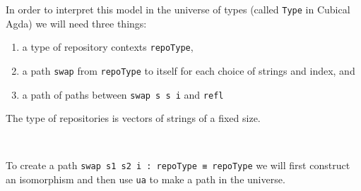In order to interpret this model in the universe of types (called \texttt{Type} in Cubical Agda)
we will need three things:
\begin{enumerate}
  \item a type of repository contexts \texttt{repoType},
  \item a path \texttt{swap} from \texttt{repoType} to itself for
        each choice of strings and index, and
  \item a path of paths between \texttt{swap s s i} and \texttt{refl}
\end{enumerate}

The type of repositories is vectors of strings of a fixed size.
\begin{code}%
\>[0]\AgdaSpace{}%
\AgdaSymbol{:}\AgdaSpace{}%
\<%
\\
\>[0]\AgdaSpace{}%
\AgdaSymbol{=}\AgdaSpace{}%
\AgdaSpace{}%
\AgdaSpace{}%
\<%
\end{code}
To create a path \texttt{swap s1 s2 i : repoType ≡ repoType} we will first construct an
isomorphism and then use \texttt{ua} to make a path in the universe.

